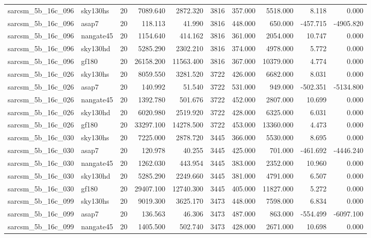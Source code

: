 \documentclass{article}
\begin{document}
\begin{longtable}{llrrrrrrrr}
sarcsm\_5b\_16c\_096 & sky130hs & 20 & 7089.640 & 2872.320 & 3816 & 357.000 & 5518.000 & 8.118 & 0.000 \\
sarcsm\_5b\_16c\_096 & asap7 & 20 & 118.113 & 41.990 & 3816 & 448.000 & 650.000 & -457.715 & -4905.820 \\
sarcsm\_5b\_16c\_096 & nangate45 & 20 & 1154.640 & 414.162 & 3816 & 361.000 & 2054.000 & 10.747 & 0.000 \\
sarcsm\_5b\_16c\_096 & sky130hd & 20 & 5285.290 & 2302.210 & 3816 & 374.000 & 4978.000 & 5.772 & 0.000 \\
sarcsm\_5b\_16c\_096 & gf180 & 20 & 26158.200 & 11563.400 & 3816 & 367.000 & 10379.000 & 4.774 & 0.000 \\
sarcsm\_5b\_16c\_026 & sky130hs & 20 & 8059.550 & 3281.520 & 3722 & 426.000 & 6682.000 & 8.031 & 0.000 \\
sarcsm\_5b\_16c\_026 & asap7 & 20 & 140.992 & 51.540 & 3722 & 531.000 & 949.000 & -502.351 & -5134.800 \\
sarcsm\_5b\_16c\_026 & nangate45 & 20 & 1392.780 & 501.676 & 3722 & 452.000 & 2807.000 & 10.699 & 0.000 \\
sarcsm\_5b\_16c\_026 & sky130hd & 20 & 6020.980 & 2519.920 & 3722 & 428.000 & 6325.000 & 6.031 & 0.000 \\
sarcsm\_5b\_16c\_026 & gf180 & 20 & 33297.100 & 14278.500 & 3722 & 453.000 & 13360.000 & 4.473 & 0.000 \\
sarcsm\_5b\_16c\_030 & sky130hs & 20 & 7225.000 & 2878.720 & 3445 & 366.000 & 5530.000 & 8.695 & 0.000 \\
sarcsm\_5b\_16c\_030 & asap7 & 20 & 120.978 & 40.255 & 3445 & 425.000 & 701.000 & -461.692 & -4446.240 \\
sarcsm\_5b\_16c\_030 & nangate45 & 20 & 1262.030 & 443.954 & 3445 & 383.000 & 2352.000 & 10.960 & 0.000 \\
sarcsm\_5b\_16c\_030 & sky130hd & 20 & 5285.290 & 2249.660 & 3445 & 381.000 & 4791.000 & 6.507 & 0.000 \\
sarcsm\_5b\_16c\_030 & gf180 & 20 & 29407.100 & 12740.300 & 3445 & 405.000 & 11827.000 & 5.272 & 0.000 \\
sarcsm\_5b\_16c\_099 & sky130hs & 20 & 9019.300 & 3625.170 & 3473 & 448.000 & 7598.000 & 6.834 & 0.000 \\
sarcsm\_5b\_16c\_099 & asap7 & 20 & 136.563 & 46.306 & 3473 & 487.000 & 863.000 & -554.499 & -6097.100 \\
sarcsm\_5b\_16c\_099 & nangate45 & 20 & 1405.500 & 502.740 & 3473 & 428.000 & 2671.000 & 10.698 & 0.000 \\

\end{longtable}
\end{document}
